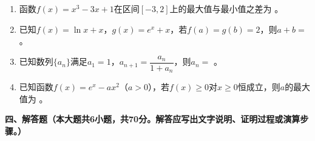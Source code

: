 \documentclass[12pt, a4paper]{ctexart}
\begin{document}
\begin{enumerate}[label=\arabic*.]

\item 函数$f(x)=x^3-3x+1$在区间$[-3,2]$上的最大值与最小值之差为 \underline{\hspace{3cm}}。

\item 已知$f(x)=\ln x+x$，$g(x)=e^x+x$，若$f(a)=g(b)=2$，则$a+b=$ \underline{\hspace{3cm}}。

\item 已知数列$\{a_n\}$满足$a_1=1$，$a_{n+1}=\dfrac{a_n}{1+a_n}$，则$a_n=$ \underline{\hspace{3cm}}。

\item 已知函数$f(x)=e^x-ax^2$（$a>0$），若$f(x)\geq 0$对$x\geq 0$恒成立，则$a$的最大值为 \underline{\hspace{3cm}}。

\end{enumerate}

\vspace{0.5em}

\noindent\textbf{四、解答题（本大题共6小题，共70分。解答应写出文字说明、证明过程或演算步骤。）}
\end{document}
